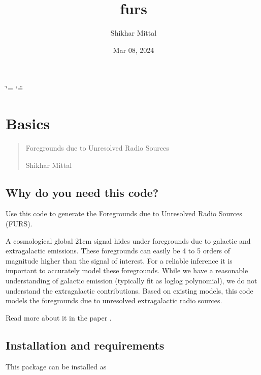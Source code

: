 \documentclass[letterpaper,10pt,english]{sphinxmanual}
\title{furs}
\date{Mar 08, 2024}
\author{Shikhar Mittal}
\begin{document}
\ifdefined\shorthandoff
  \ifnum\catcode`\=\string=\active\shorthandoff{=}\fi
  \ifnum\catcode`\"=\active{}\fi
\fi

\pagestyle{empty}
\sphinxmaketitle
\pagestyle{plain}
\sphinxtableofcontents
\pagestyle{normal}
\label{\detokenize{index::doc}}


\sphinxstepscope


\chapter{Basics}
\label{\detokenize{basics:basics}}\label{\detokenize{basics::doc}}\begin{quote}\begin{description}
\sphinxAtStartPar
Foregrounds due to Unresolved Radio Sources

\sphinxAtStartPar
Shikhar Mittal

\sphinxAtStartPar
{}

\end{description}\end{quote}


\section{Why do you need this code?}
\label{\detokenize{basics:why-do-you-need-this-code}}
\sphinxAtStartPar
Use this code to generate the Foregrounds due to
Unresolved Radio Sources (FURS).

\sphinxAtStartPar
A cosmological global 21\sphinxhyphen{}cm signal hides under foregrounds due to
galactic and extragalactic emissions. These foregrounds can easily be 4
to 5 orders of magnitude higher than the signal of interest. For a
reliable inference it is important to accurately model these
foregrounds. While we have a reasonable understanding of galactic
emission (typically fit as log\sphinxhyphen{}log polynomial), we do not understand the
extragalactic contributions. Based on existing models, this code models
the foregrounds due to unresolved extragalactic radio sources.

\sphinxAtStartPar
Read more about it in the paper .


\section{Installation and requirements}
\label{\detokenize{basics:installation-and-requirements}}
\sphinxAtStartPar
This package can be installed as
\end{document}
